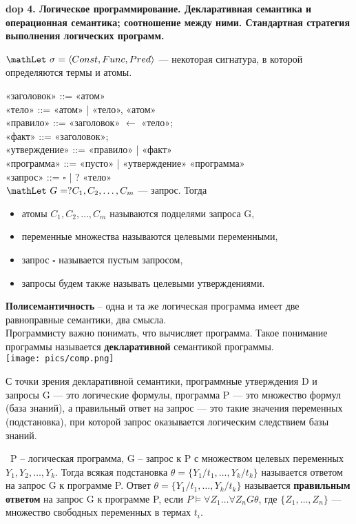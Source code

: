 \textbf{\LARGE dop 4. Логическое  программирование. Декларативная семантика и операционная семантика;  соотношение между ними.  Стандартная стратегия выполнения логических программ.}

$\mathLet ~ \sigma = \langle Const,Func,Pred\rangle$ — некоторая сигнатура, в которой определяются термы и атомы.

«заголовок» ::= «атом» \\
«тело» ::= «атом» | «тело», «атом» \\ 
«правило» ::= «заголовок» $\leftarrow$ «тело»; \\
«факт» ::= «заголовок»; \\ 
«утверждение» ::= «правило» | «факт» \\ 
«программа» ::= «пусто» | «утверждение» «программа» \\
«запрос» ::= $\square$ | ? «тело» \\

$\mathLet ~ G = ? C_{1},C_{2},\ldots,C_{m}$ — запрос. Тогда
\begin{itemize}
    \item атомы $C_{1},C_{2},\ldots,C_{m}$ называются подцелями запроса G,
    \item переменные множества называются целевыми переменными,
    \item запрос $\square$ называется пустым запросом,
    \item запросы будем также называть целевыми утверждениями.
\end{itemize}
 
\textbf{Полисемантичность} -- одна и та же логическая программа имеет две равноправные семантики, два смысла. \\
Программисту важно понимать, что вычисляет программа. Такое понимание программы называется \textbf{декларативной} семантикой программы. \\ 
\texttt{[image: pics/comp.png]}

С точки зрения декларативной семантики, программные утверждения D и запросы G — это логические формулы, программа P — это множество формул (база знаний), а правильный ответ на запрос — это такие значения переменных (подстановка), при которой запрос оказывается логическим следствием базы знаний.

\mathLet \ P -- логическая программа, G -- запрос к P с множеством целевых переменных $Y_{1},Y_{2},\ldots,Y_{k}$. Тогда всякая подстановка $\theta = \{Y_{1}/t_{1},\ldots,Y_{k}/t_{k}\}$ называется ответом на запрос G к программе P. Ответ $\theta = \{Y_{1}/t_{1},\ldots, Y_{k}/t_{k}\}$ называется \textbf{правильным ответом} на запрос G к программе P, если $P \models \forall Z_{1} \ldots \forall Z_{n}G\theta$, где $\{Z_{1},\ldots,Z_{n}\}$ --- множество свободных переменных в термах $t_i$.

